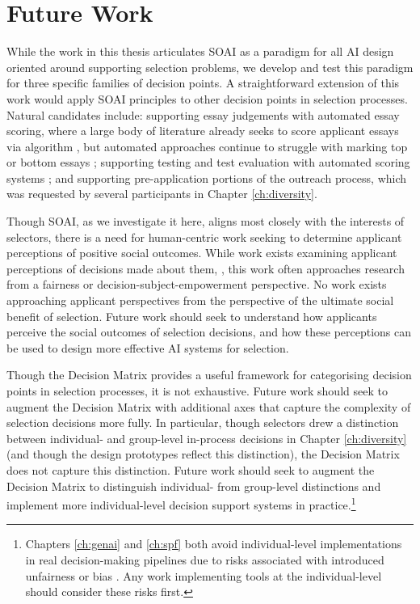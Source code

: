 \section{Future Work}
While the work in this thesis articulates SOAI as a paradigm for all AI design oriented around supporting selection problems, we develop and test this paradigm for three specific families of decision points. A straightforward extension of this work would apply SOAI principles to other decision points in selection processes. Natural candidates include: supporting essay judgements with automated essay scoring, where a large body of literature already seeks to score applicant essays via algorithm \cite{cozma_automated_2018,ramesh_automated_2022,wang_use_2022,elijahthesis}, but automated approaches continue to struggle with marking top or bottom essays \cite{elijahthesis}; supporting testing and test evaluation with automated scoring systems \cite{organisciak_beyond_2023,condon2014international}; and supporting pre-application portions of the outreach process, which was requested by several participants in Chapter \ref{ch:diversity}.

Though SOAI, as we investigate it here, aligns most closely with the interests of selectors, there is a need for human-centric work seeking to determine applicant perceptions of positive social outcomes. While work exists examining applicant perceptions of decisions made about them, \cite{pandey_applicants_2022,horodyski_applicants_2023}, this work often approaches research from a fairness or decision-subject-empowerment perspective. No work exists approaching applicant perspectives from the perspective of the ultimate social benefit of selection. Future work should seek to understand how applicants perceive the social outcomes of selection decisions, and how these perceptions can be used to design more effective AI systems for selection.

Though the Decision Matrix provides a useful framework for categorising decision points in selection processes, it is not exhaustive. Future work should seek to augment the Decision Matrix with additional axes that capture the complexity of selection decisions more fully. In particular, though selectors drew a distinction between individual- and group-level in-process decisions in Chapter \ref{ch:diversity} (and though the design prototypes reflect this distinction), the Decision Matrix does not capture this distinction. Future work should seek to augment the Decision Matrix to distinguish individual- from group-level distinctions and implement more individual-level decision support systems in practice.\footnote{Chapters \ref{ch:genai} and \ref{ch:spf} both avoid individual-level implementations in real decision-making pipelines due to risks associated with introduced unfairness or bias \cite{hartigan_fairness_1989,barocas2023fairness,pmlr-v80-kearns18a,Bastounis_Campodonico_vanderSchaar_Adcock_Hansen_2024,liang_gpt_2023}. Any work implementing tools at the individual-level should consider these risks first.}

